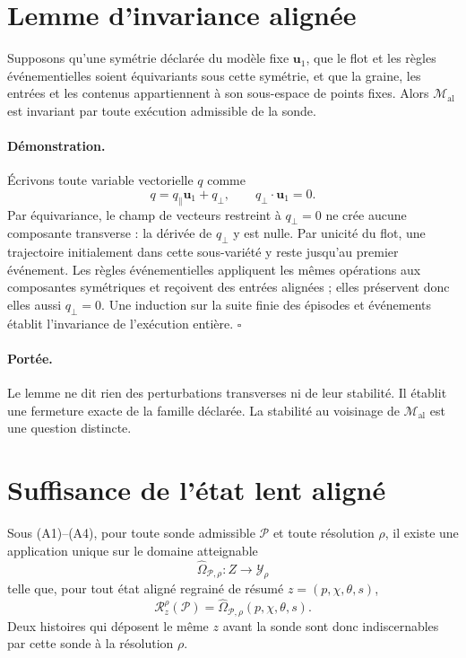 \section{Lemme d'invariance alignée}
\label{annexe-I-lemme-invariance}

\begin{encadre}[title={Lemme \theproposition{} --- Invariance de la famille alignée}]
Supposons qu'une symétrie déclarée du modèle fixe $\mathbf u_1$, que le
flot et les règles événementielles soient équivariants sous cette
symétrie, et que la graine, les entrées et les contenus appartiennent à
son sous-espace de points fixes. Alors
$\mathcal M_{\mathrm{al}}$ est invariant par toute exécution admissible
de la sonde.
\end{encadre}

\paragraph{Démonstration.}
Écrivons toute variable vectorielle $q$ comme
\[
q=q_\parallel\mathbf u_1+q_\perp,
\qquad q_\perp\cdot\mathbf u_1=0.
\]
Par équivariance, le champ de vecteurs restreint à $q_\perp=0$ ne crée
aucune composante transverse : la dérivée de $q_\perp$ y est nulle. Par
unicité du flot, une trajectoire initialement dans cette sous-variété y
reste jusqu'au premier événement. Les règles événementielles appliquent
les mêmes opérations aux composantes symétriques et reçoivent des
entrées alignées ; elles préservent donc elles aussi $q_\perp=0$. Une
induction sur la suite finie des épisodes et événements établit
l'invariance de l'exécution entière. \hfill$\square$

\paragraph{Portée.}
Le lemme ne dit rien des perturbations transverses ni de leur stabilité.
Il établit une fermeture exacte de la famille déclarée. La stabilité au
voisinage de $\mathcal M_{\mathrm{al}}$ est une question distincte.

\section{Suffisance de l'état lent aligné}
\label{annexe-I-suffisance-etat-lent}

\begin{encadre}[title={Proposition \theproposition{} --- Paramétrage exact par l'état lent aligné}]
Sous (A1)--(A4), pour toute sonde admissible $\mathcal P$ et toute
résolution $\rho$, il existe une application unique sur le domaine
atteignable
\[
\widehat\Omega_{\mathcal P,\rho}:Z\longrightarrow\mathcal Y_\rho
\]
telle que, pour tout état aligné regrainé de résumé
$z=(p,\chi,\theta,s)$,
\begin{equation}
\label{eq:annexe-I-proposition}
\boxed{
\mathcal R_z^\rho(\mathcal P)
=
\widehat\Omega_{\mathcal P,\rho}(p,\chi,\theta,s).
}
\end{equation}
Deux histoires qui déposent le même $z$ avant la sonde sont donc
indiscernables par cette sonde à la résolution $\rho$.
\end{encadre}

